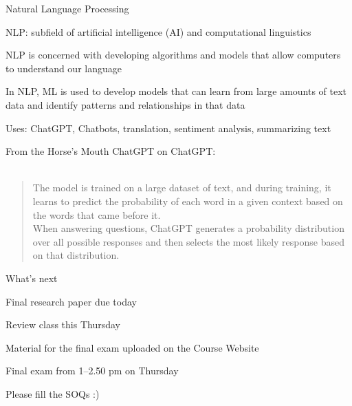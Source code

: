 \documentclass{./../div_teaching_slides}
\begin{document}
\begin{frame}{Natural Language Processing}
\begin{witemize}
  \item NLP: subfield of artificial intelligence (AI) and computational linguistics
  \item NLP is concerned with developing algorithms and models that allow computers to understand our language
  \item In NLP, ML is used to develop models that can learn from large amounts of text data and identify patterns and relationships in that data
  \item Uses: ChatGPT, Chatbots, translation, sentiment analysis, summarizing text
\end{witemize}
\end{frame}

\begin{frame}{From the Horse's Mouth}
ChatGPT on ChatGPT: \\~\\
\begin{quote}
The model is trained on a large dataset of text, and during training, it learns to predict the probability of each word in a given context based on the words that came before it. \\ \vspace{0.5em}
When answering questions, ChatGPT generates a probability distribution over all possible responses and then selects the most likely response based on that distribution. 
\end{quote}
\end{frame}

\begin{frame}{What's next}
\begin{witemize}
  \item Final research paper due today
  \item Review class this Thursday 
  \item Material for the final exam uploaded on the Course Website
  \item Final exam from 1--2.50 pm on Thursday 
  \item Please fill the SOQs :)
\end{witemize}

\end{frame}
\end{document}
